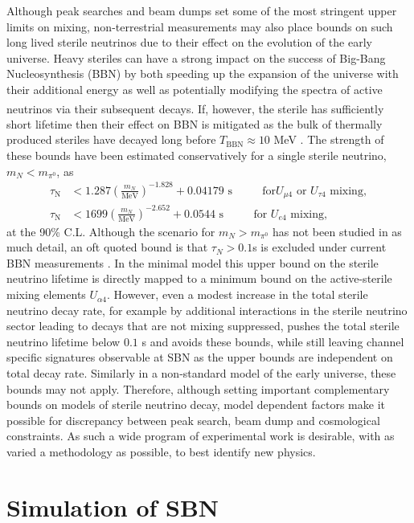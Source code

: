 \documentclass[11pt, a4paper]{article}
\newcounter{CommentCount}
\newcommand{\marcom}[2]{\textsuperscript{\textcolor{#1}{\theCommentCount}}\marginpar{\textsuperscript{\textcolor{#1}{\theCommentCount}}\textcolor{#1}{{\small#1: #2}}}\stepcounter{CommentCount}}
\begin{document}
Although peak searches and beam dumps set some of the most stringent upper
limits on mixing, non-terrestrial measurements may also place bounds on such
long lived sterile neutrinos due to their effect on the evolution of the early
universe. Heavy steriles can have a strong impact on the success of Big-Bang
Nucleosynthesis (BBN) by both speeding up the expansion of the universe with
their additional energy as well as potentially modifying the spectra of active
neutrinos via their subsequent decays\marcom{PB}{See S.'s comment}. If, however, the sterile has
sufficiently short lifetime then their effect on BBN is mitigated as the bulk
of thermally produced steriles have decayed long before $T_\text{BBN} \approx
10$ MeV \cite{Fields:2006ga}. The strength of these bounds have been estimated
conservatively for a single sterile neutrino, $m_N < m_{\pi^0}$, as
\cite{Dolgov:2000jw,Dolgov:2000pj}
%
\begin{align*} \tau_\text{N} &< 1.287 \left(
\frac{m_N}{\text{MeV}}\right)^{-1.828}+0.04179 \text{  s    $\qquad$  for
$U_{\mu 4}$ or $U_{\tau 4}$ mixing},\\ \tau_\text{N} &< 1699 \left(
\frac{m_N}{\text{MeV}}\right)^{-2.652}+0.0544 \text{  s    $\qquad$  for $U_{e
4}$ mixing}, \end{align*}
%
at the 90\% C.L. Although the scenario for $m_N > m_{\pi^0}$ has not been
studied in as much detail, an oft quoted bound is that $\tau_N > 0.1$s is
excluded under current BBN measurements \cite{Dolgov:2000jw}. In the minimal
model this upper bound on the sterile neutrino lifetime is directly mapped to a minimum
bound on the active-sterile mixing elements $U_{\alpha 4}$. However, even a
modest increase in the total sterile neutrino decay rate, for example by additional
interactions in the sterile neutrino sector leading to decays that are not mixing
suppressed, pushes the total sterile neutrino lifetime below $0.1$ s and avoids these
bounds, while still leaving channel specific signatures observable at SBN as
the upper bounds are independent on total decay rate. Similarly in a
non-standard model of the early universe, these bounds may not apply.
Therefore, although setting important complementary bounds on models of sterile
neutrino decay, model dependent factors make it possible for discrepancy
between peak search, beam dump and cosmological constraints. As such a wide
program of experimental work is desirable, with as varied a methodology as
possible, to best identify new physics.

\section{\label{sec:simulation}Simulation of SBN}
\end{document}
